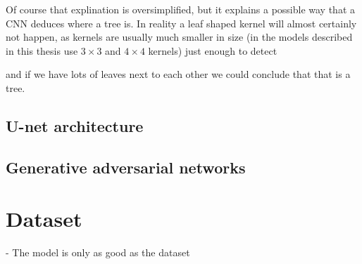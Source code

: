 Of course that explination is oversimplified, but it explains a possible way 
that a CNN deduces where a tree is. In reality a leaf shaped kernel will almost
certainly not happen, as kernels are usually much smaller in size (in the models
described in this thesis use $3\times3$ and $4\times4$ kernels) just enough to detect



and if we have lots of leaves next to 
each other we could conclude that that is a tree.



\subsection{U-net architecture}
\subsection{Generative adversarial networks}

\section{Dataset}
\label{sec:dataset}

- The model is only as good as the dataset
